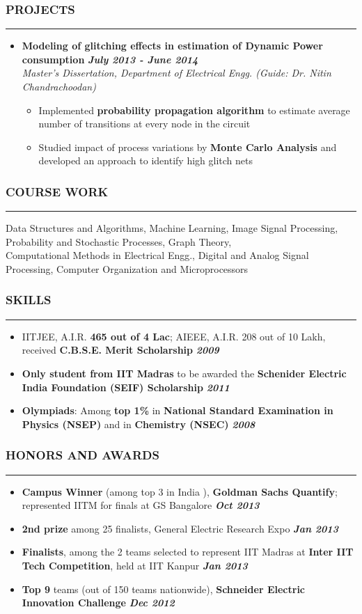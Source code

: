 \documentclass[10pt,a4paper,English]{article}
\newcommand\roottitle[1]{\vspace{-4mm}\subsubsection*{\uppercase{#1}}\vspace{-0.3em}\nopagebreak[4]\hrule\vspace{4mm}}
\newcommand\itemyear[1]{\hfill \textbf{\emph{\color{itemyear} #1}}}
\newcommand\itemenv{\setlength\itemsep{0.5pt} \addtolength{\itemindent}{-5mm}\vspace{-1.5mm}}
\begin{document}
\roottitle{Projects}
\begin{itemize} \itemenv
    \item \textbf{Modeling of glitching effects in estimation of Dynamic Power consumption} \hfill \itemyear{July 2013 - June 2014} \\
    \emph{Master's Dissertation, Department of Electrical Engg. (Guide: Dr. Nitin Chandrachoodan)}
        \begin{itemize} \itemenv
            \item Implemented \textbf{probability propagation algorithm} to estimate average number of transitions at every node in the circuit
            \item Studied impact of process variations by \textbf{Monte Carlo Analysis} and developed an approach to identify high glitch nets
        \end{itemize}
\end{itemize}

\roottitle{Course Work}
\vspace{-2mm}
\noindent Data Structures and Algorithms, Machine Learning, Image Signal Processing, Probability and Stochastic Processes, Graph Theory, \\ 
Computational Methods in Electrical Engg., Digital and Analog Signal Processing, Computer Organization and Microprocessors
\vspace{2mm}

\roottitle{Skills}
\begin{itemize} \itemenv
    \item IITJEE, A.I.R. \textbf{465 out of 4 Lac}; AIEEE, A.I.R. 208 out of 10 Lakh, received \textbf{C.B.S.E. Merit Scholarship} \itemyear{2009}
    \item \textbf{Only student from IIT Madras} to be awarded the \textbf{Schenider Electric India Foundation (SEIF) Scholarship} \itemyear{2011} 
    \item \textbf{Olympiads}: Among \textbf{top 1\%} in \textbf{National Standard Examination in Physics (NSEP)} and in \textbf{Chemistry (NSEC)} \itemyear{2008}
\end{itemize}

\roottitle{Honors and Awards}
\begin{itemize} \itemenv
    \item \textbf{Campus Winner} (among top {3} in India ), \textbf{Goldman Sachs Quantify}; represented IITM for finals at GS Bangalore \itemyear{Oct 2013}
    \item \textbf{2nd prize} among 25 finalists, General Electric Research Expo \itemyear{Jan 2013}
    \item \textbf{Finalists}, among the 2 teams selected to represent IIT Madras at \textbf{Inter IIT Tech Competition}, held at IIT Kanpur \itemyear{Jan 2013}
    \item \textbf{Top 9} teams (out of 150 teams nationwide), \textbf{Schneider Electric Innovation Challenge} \itemyear{ Dec 2012 } 
\end{itemize}
\end{document}
